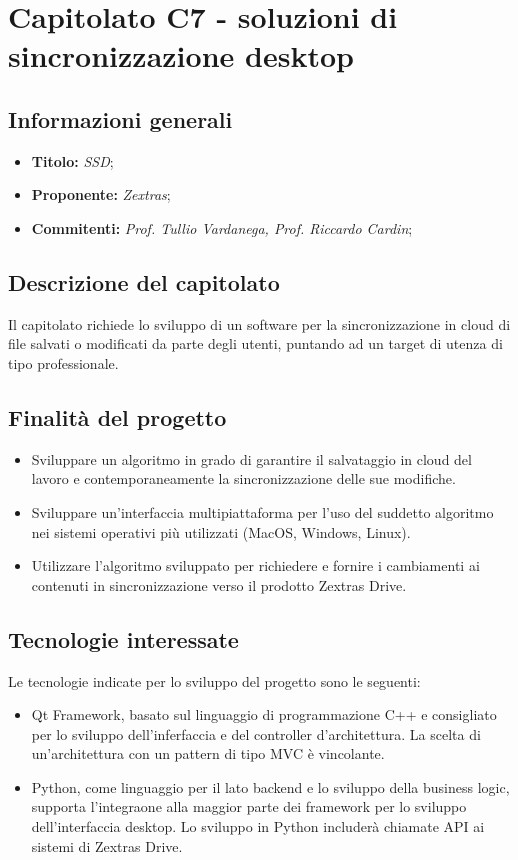 \section{Capitolato C7 - soluzioni di sincronizzazione desktop}
\subsection{Informazioni generali}
\begin{itemize}
    \item \textbf{Titolo:} \textit{SSD};
    \item \textbf{Proponente:} \textit{Zextras};
    \item \textbf{Commitenti:} \textit{Prof. Tullio Vardanega, Prof. Riccardo Cardin};
\end{itemize}
\subsection{Descrizione del capitolato}
Il capitolato richiede lo sviluppo di un software per la sincronizzazione in cloud di file salvati o modificati da parte degli utenti, puntando ad un target di utenza di tipo professionale.
\subsection{Finalità del progetto}
\begin{itemize}
    \item Sviluppare un algoritmo in grado di garantire
    il salvataggio in cloud del lavoro e contemporaneamente la sincronizzazione
    delle sue modifiche.
    \item Sviluppare un’interfaccia multipiattaforma per l’uso
    del suddetto algoritmo nei sistemi operativi più utilizzati (MacOS,
    Windows, Linux).
    \item  Utilizzare l’algoritmo sviluppato per richiedere e fornire i
    cambiamenti ai contenuti in sincronizzazione verso il prodotto Zextras
    Drive.
\end{itemize}
\subsection{Tecnologie interessate}
Le tecnologie indicate per lo sviluppo del progetto sono le seguenti:
    \begin{itemize}
        \item Qt Framework, basato sul linguaggio di programmazione C++ e consigliato per lo sviluppo dell'inferfaccia e del controller d'architettura. La scelta di un'architettura con un pattern di tipo MVC è vincolante.
        \item Python, come linguaggio per il lato backend e lo sviluppo della business logic, supporta l'integraone alla maggior parte dei framework per lo sviluppo dell'interfaccia desktop. Lo sviluppo in Python includerà chiamate API ai sistemi di Zextras Drive.
    \end{itemize}
